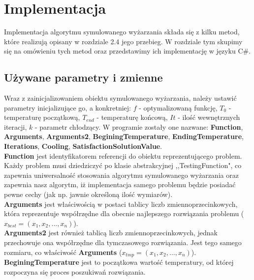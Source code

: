 \documentclass[twoside]{projektInzynierskiMS1}
\newcommand{\si}{ś}
\begin{document}
\section{Implementacja}

Implementacja algorytmu symulowanego wyżarzania składa się z kilku metod, które realizują opisany w rozdziale 2.4 jego przebieg. W rozdziale tym skupimy się na omówieniu tych metod oraz przedstawimy ich implementację w języku C\#. \\

\subsection{Używane parametry i zmienne}
Wraz z zainicjalizowaniem obiektu symulowanego wyżarzania, należy ustawić parametry inicjalizujące go, a konkretniej: $f$ - optymalizowaną funkcję, $T_0$ - temperaturę początkową, $T_{end}$ - temperaturę końcową, $It$ - ilo\si ć wewnętrznych iteracji, $k$ - parametr chłodzący. W programie zostały one nazwane: \textbf{Function}, \textbf{Arguments}, \textbf{Arguments2}, \textbf{BeginingTemperature}, \textbf{EndingTemperature}, \textbf{Iterations}, \textbf{Cooling}, \textbf{SatisfactionSolutionValue}. \\

\textbf{Function} jest identyfikatorem referencji do obiektu reprezentującego problem. Każdy problem musi dziedziczyć po klasie abstrakcyjnej ,,TestingFunction", co zapewnia uniwersalno\si ć stosowania algorytmu symulowanego wyżarzania oraz zapewnia nasz algorytm, iż implementacja samego problemu będzie posiadać pewne cechy (jak np. jawnie okre\si loną ilo\si ć wymiarów). \\

\textbf{Arguments} jest wła\si ciwo\si cią w postaci tablicy liczb zmiennoprzecinkowych, która reprezentuje współrzędne dla obecnie najlepszego rozwiązania problemu ($x_{best} = (x_1, x_2, ..., x_n)$). \\

\textbf{Arguments2} jest również tablicą liczb zmiennoprzecinkowych, jednak przechowuje ona współrzędne dla tymczasowego rozwiązania. Jest tego samego rozmiaru, co wła\si ciwo\si ć \textbf{Arguments} ($x_{tmp} = (x_1, x_2, ..., x_n)$). \\

\textbf{BeginingTemperature} jest to początkowa warto\si ć temperatury, od której rozpoczyna się proces poszukiwań rozwiązania. \\ 
\end{document}

